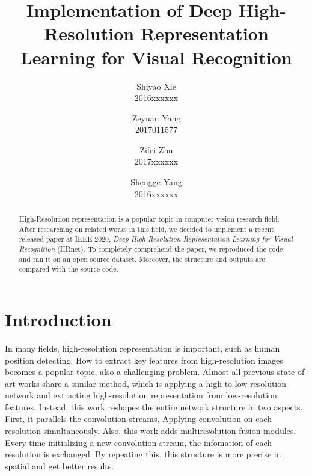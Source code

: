 \documentclass[10pt,twocolumn,letterpaper]{article}
\begin{document}
\title{Implementation of Deep High-Resolution Representation\\ Learning for Visual Recognition}

\author{Shiyao Xie\\
2016xxxxxx\\
\and
Zeyuan Yang\\
2017011577\\
\and
Zifei Zhu\\
2017xxxxxx\\
\and
Shengge Yang\\
2016xxxxxx\\
}

\maketitle

\begin{abstract}
   High-Resolution representation is a popular topic in computer vision research field.
   After researching on related works in this field,
   we decided to implement a recent released paper at IEEE 2020,
   \emph{Deep High-Resolution Representation Learning for Visual Recognition} (HRnet).\cite{wang2019deep}
   To completely comprehend the paper,
   we reproduced the code and ran it on an open source dataset.
   Moreover, the structure and outputs are compared with the source code.
\end{abstract}

\section{Introduction}

In many fields, high-resolution representation is important,
such as human position detecting.
How to extract key features from high-resolution images becomes a popular topic,
also a challenging problem.
Almost all previous state-of-art works share a similar method,
which is applying a high-to-low resolution network and extracting high-resolution representation from low-resolution features.
Instead, this work reshapes the entire network structure in two aspects.
First, it parallels the convolution streams,
Applying convolution on each resolution simultaneously.
Also, this work adds multiresolution fusion modules.
Every time initializing a new convolution stream,
the infomation of each resolution is exchanged.
By repeating this, this structure is more precise in spatial and get better results.
\end{document}
